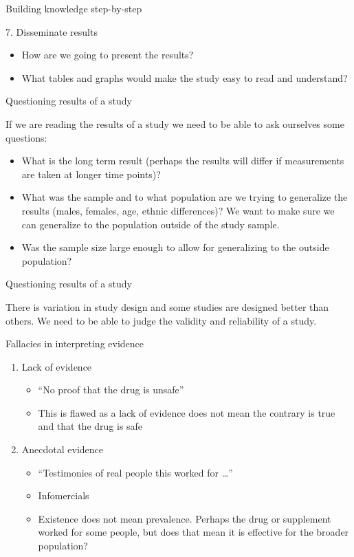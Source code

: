 \documentclass[14pt]{beamer}\usepackage[]{graphicx}\usepackage[]{color}
\begin{document}
\begin{frame}[fragile]{Building knowledge step-by-step}

7. Disseminate results

\begin{itemize}
\item How are we going to present the results?
\item What tables and graphs would make the study easy to read and understand?
\end{itemize}
\end{frame}

\begin{frame}[fragile]{Questioning results of a study}

{\small{
If we are reading the results of a study we need to be able to ask ourselves some questions:

\begin{itemize}
\item What is the long term result (perhaps the results will differ if measurements are taken at longer time points)?
\item What was the sample and to what population are we trying to generalize the results (males, females, age, ethnic differences)?  We want to make sure we can generalize to the population outside of the study sample.
\item Was the sample size large enough to allow for generalizing to the outside population?
\end{itemize}
}}
\end{frame}

\begin{frame}[fragile]{Questioning results of a study}

There is variation in study design and some studies are designed better than others.  We need to be able to judge the validity and reliability of a study.
\end{frame}

\begin{frame}[fragile]{Fallacies in interpreting evidence}

\begin{enumerate}
\item Lack of evidence
  \begin{itemize}
  \item ``No proof that the drug is unsafe''
  \item This is flawed as a lack of evidence does not mean the contrary is true and that the drug is safe
  \end{itemize}
\item Anecdotal evidence
  \begin{itemize}
  \item ``Testimonies of real people this worked for \dots''
  \item Infomercials
  \item Existence does not mean prevalence.  Perhaps the drug or supplement worked for some people, but does that mean it is effective for the broader population?
  \end{itemize}
\end{enumerate}
\end{frame}
\end{document}
